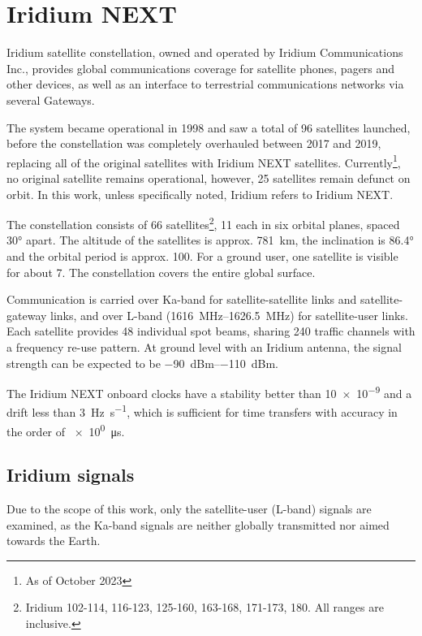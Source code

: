 \section{Iridium NEXT}
\label{s_sat_iridium}
Iridium satellite constellation, owned and operated by Iridium Communications Inc., provides global communications coverage for satellite phones, pagers and other devices, as well as an interface to terrestrial communications networks via several Gateways.

The system became operational in 1998 and saw a total of 96 satellites launched, before the constellation was completely overhauled between 2017 and 2019, replacing all of the original satellites with Iridium NEXT satellites. Currently\footnote{As of October 2023}, no original satellite remains operational, however, 25 satellites remain defunct on orbit\cite{sat06}. In this work, unless specifically noted, Iridium refers to Iridium NEXT.

The constellation consists of 66 satellites\footnote{Iridium 102-114, 116-123, 125-160, 163-168, 171-173, 180. All ranges are inclusive.}, 11 each in six orbital planes, spaced \ang{30} apart. The altitude of the satellites is approx. \qty{781}{\km}, the inclination is \ang{86.4} and the orbital period is approx. \qty{100}{\min}. For a ground user, one satellite is visible for about \qty{7}{\min}. The constellation covers the entire global surface\cite{sat01}.

Communication is carried over Ka-band for satellite-satellite links and satellite-gateway links, and over L-band (\qtyrange{1616}{1626.5}{\mega\hertz}) for satellite-user links. Each satellite provides 48 individual spot beams, sharing 240 traffic channels with a frequency re-use pattern\cite{sat07}. At ground level with an Iridium antenna, the signal strength can be expected to be \qtyrange{-90}{-110}{dBm}\cite{sop01}.

The Iridium NEXT onboard clocks have a stability better than \num{10e-9} and a drift less than \qty{3}{\hertz\per\s}, which is sufficient for time transfers with accuracy in the order of \qty{e0}{\micro\s}\cite{sop11}.
\subsection{Iridium signals}
\label{s_sat_iridium_signals}
Due to the scope of this work, only the satellite-user (L-band) signals are examined, as the Ka-band signals are neither globally transmitted nor aimed towards the Earth.

